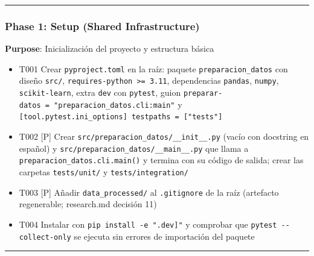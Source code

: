 \documentclass[12pt,a4paper]{article}
\providecommand{\tightlist}{\setlength{\itemsep}{0pt}\setlength{\parskip}{0pt}}
\newenvironment{documentogenerado}[2]{%
  \def\doccomando{#1}\def\docruta{#2}%
  \par\begingroup\small\setstretch{1.15}\sloppy%
}{\endgroup\par\medskip}
\begin{document}
\begin{documentogenerado}{/speckit-tasks (fase 7: /speckit-converge)}{specs\slash 001-preparacion-datos\slash tasks.md}
\begin{center}\rule{0.5\linewidth}{0.5pt}\end{center}

\subsubsection{Phase 1: Setup (Shared Infrastructure)}

\textbf{Purpose}: Inicialización del proyecto y estructura básica

\begin{itemize}
\tightlist
\item[$\boxtimes$]
  T001 Crear \texttt{pyproject.\allowbreak{}toml} en la raíz: paquete \texttt{preparacion\_\allowbreak{}datos} con diseño \texttt{src/}, \texttt{requires-\allowbreak{}python\ \textgreater{}=\allowbreak{}\ 3.\allowbreak{}11}, dependencias \texttt{pandas}, \texttt{numpy}, \texttt{scikit-\allowbreak{}learn}, extra \texttt{dev} con \texttt{pytest}, guion \texttt{preparar-\allowbreak{}datos\ =\allowbreak{}\ "preparacion\_\allowbreak{}datos.\allowbreak{}cli:main"} y \texttt{{[}tool.\allowbreak{}pytest.\allowbreak{}ini\_\allowbreak{}options{]}\ testpaths\ =\allowbreak{}\ {[}"tests"{]}}
\item[$\boxtimes$]
  T002 {[}P{]} Crear \texttt{src/\allowbreak{}preparacion\_\allowbreak{}datos/\allowbreak{}\_\allowbreak{}\_\allowbreak{}init\_\allowbreak{}\_\allowbreak{}.\allowbreak{}py} (vacío con docstring en español) y \texttt{src/\allowbreak{}preparacion\_\allowbreak{}datos/\allowbreak{}\_\allowbreak{}\_\allowbreak{}main\_\allowbreak{}\_\allowbreak{}.\allowbreak{}py} que llama a \texttt{preparacion\_\allowbreak{}datos.\allowbreak{}cli.\allowbreak{}main()} y termina con su código de salida; crear las carpetas \texttt{tests/\allowbreak{}unit/} y \texttt{tests/\allowbreak{}integration/}
\item[$\boxtimes$]
  T003 {[}P{]} Añadir \texttt{data\_\allowbreak{}processed/} al \texttt{.\allowbreak{}gitignore} de la raíz (artefacto regenerable; research.md decisión 11)
\item[$\boxtimes$]
  T004 Instalar con \texttt{pip\ install\ -\allowbreak{}e\ ".\allowbreak{}{[}dev{]}"} y comprobar que \texttt{pytest\ -\allowbreak{}\/\allowbreak{}-\allowbreak{}collect-\allowbreak{}only} se ejecuta sin errores de importación del paquete
\end{itemize}

\begin{center}\rule{0.5\linewidth}{0.5pt}\end{center}


\end{documentogenerado}
\end{document}
